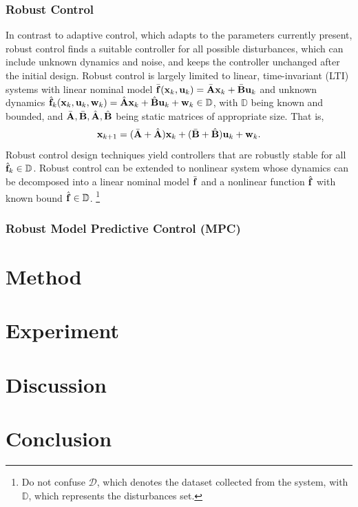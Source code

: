\documentclass{article}
\begin{document}
\subsubsection{Robust Control}

In contrast to adaptive control, which adapts to the parameters currently present, robust control finds a suitable controller for all possible disturbances, which can include unknown dynamics and noise, and keeps the controller unchanged after the initial design.
Robust control is largely limited to linear, time-invariant (LTI) systems with linear nominal model $\bar{\mathbf{f}}(\mathbf{x}_k, \mathbf{u}_k) = \bar{\mathbf{A}} \mathbf{x}_k + \bar{\mathbf{B}} \mathbf{u}_k$ and unknown dynamics $\hat{\mathbf{f}}_k(\mathbf{x}_k, \mathbf{u}_k, \mathbf{w}_k) = \hat{\mathbf{A}} \mathbf{x}_k + \hat{\mathbf{B}} \mathbf{u}_k + \mathbf{w}_k \in \mathbb{D}$, with $\mathbb{D}$ being known and bounded, and $\bar{\mathbf{A}}, \bar{\mathbf{B}}, \hat{\mathbf{A}}, \hat{\mathbf{B}}$ being static matrices of appropriate size.
That is,
\begin{equation}
    \mathbf{x}_{k + 1} =(\bar{\mathbf{A}} + \hat{\mathbf{A}}) \mathbf{x}_k + (\bar{\mathbf{B}} + \hat{\mathbf{B}}) \mathbf{u}_k + \mathbf{w}_k.
\end{equation}
Robust control design techniques yield controllers that are robustly stable for all $\hat{\mathbf{f}}_k \in \mathbb{D}$.
Robust control can be extended to nonlinear system whose dynamics can be decomposed into a linear nominal model $\bar{\mathbf{f}}$ and a nonlinear function $\hat{\mathbf{f}}$ with known bound $\hat{\mathbf{f}} \in \mathbb{D}$. \footnote{Do not confuse $\mathcal{D}$, which denotes the dataset collected from the system, with $\mathbb{D}$, which represents the disturbances set. }

\subsubsection{Robust Model Predictive Control (MPC)}



\section{Method}



\section{Experiment}



\section{Discussion}



\section{Conclusion}

\end{document}
